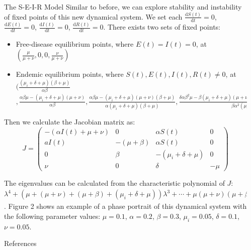\documentclass[final]{beamer}
\newlength{\sepwidth}
\newlength{\colwidth}
\newcommand{\separatorcolumn}{\begin{column}{\sepwidth}\end{column}}
\begin{document}
\begin{frame}[t]
\begin{columns}[t]
\begin{column}{\colwidth}
\begin{block}{The S-E-I-R Model}
  Similar to before, we can explore stability and instability of fixed points of this new dynamical system. We set each $\frac{\textrm{d}S(t)}{\textrm{d}t} = 0$, $\frac{\textrm{d}E(t)}{\textrm{d}t} = 0$, $\frac{\textrm{d}I(t)}{\textrm{d}t} = 0$, $\frac{\textrm{d}R(t)}{\textrm{d}t} = 0$. There exists two sets of fixed points:
  \begin{itemize}
      \item Free-disease equilibrium points, where $E(t) = I(t) = 0$, at $(\frac{\mu}{\mu + \nu}, 0, 0, \frac{\nu}{\mu + \nu})$
      \item Endemic equilibrium points, where $S(t), E(t), I(t), R(t) \neq 0$, at $(\frac{(\mu_{i} + \delta + \mu)(\beta + \mu)}{\alpha \beta}$\\
      $, \frac{\alpha \beta \mu - (\mu_{i} + \delta + \mu)(\mu + \nu)}{\alpha \beta}, \frac{\alpha \beta \mu - (\mu_{i} + \delta +\mu)(\mu + \nu)(\beta + \mu)}{\alpha (\mu_{i} + \delta + \mu)(\beta + \mu)}, \frac{\delta \alpha \beta^{2} \mu - \beta (\mu_{i} + \delta + \mu)(\mu + \nu)(\beta + \mu) - \nu ((\mu_{i} + \delta + \mu)(\beta + \mu))^{2}}{\beta \alpha^{2}(\mu_{i} + \delta + \mu)(\beta + \mu)})$
    \end{itemize}
      Then we calculate the Jacobian matrix as:
     \[J = \left( \begin{array}{cccc}
  - (\alpha I(t) + \mu + \nu) & 0 & \alpha S(t)& 0\\
   aI(t) & - (\mu +\beta) & \alpha S(t)& 0\\
   0 & \beta & -(\mu_{i} + \delta + \mu) & 0\\
   \nu & 0 & \delta & -\mu
   
  \end{array} \right)
  \]

  The eigenvalues can be calculated from the characteristic polynomial of $J$:  \\
  $
  \lambda^{4} + (\mu + (\mu + \nu) + (\mu + \beta) + (\mu_{i} + \delta + \mu))\lambda^{3} + \cdots + \mu (\mu + \nu)(\mu + \beta)(\frac{\alpha \beta \mu}{\mu + \nu}) - \mu (\mu + \nu)(\frac{\alpha \beta \mu}{\mu + \nu}) = 0
  $. Figure 2 shows an example of a phase portrait of this dynamical system with the following parameter values: $\mu = 0.1$, $\alpha = 0.2$, $\beta = 0.3$, $\mu_{i} = 0.05$, $\delta = 0.1$, $\nu = 0.05$.
  \end{block}

  \begin{block}{References}
  \vspace{1pt}
    \nocite{*}
    \footnotesize{}

  \end{block}

\end{column}

\separatorcolumn
\end{columns}
\end{frame}
\end{document}

